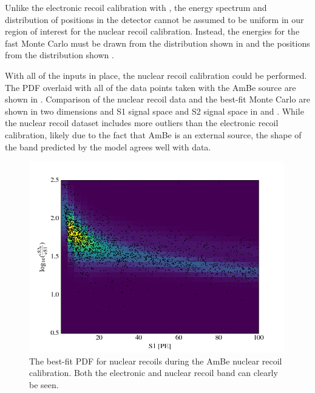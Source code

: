 Unlike the electronic recoil calibration with , the energy spectrum and distribution of positions in the detector cannot be assumed to be uniform in our region of interest for the nuclear recoil calibration.  Instead, the energies for the fast Monte Carlo must be drawn from the distribution shown in  and the positions from the distribution shown .

With all of the inputs in place, the nuclear recoil calibration could be performed.  The PDF overlaid with all of the data points taken with the AmBe source are shown in .  Comparison of the nuclear recoil data and the best-fit Monte Carlo are shown in two dimensions and S1 signal space and S2 signal space in  and .  While the nuclear recoil dataset includes more outliers than the electronic recoil calibration, likely due to the fact that AmBe is an external source, the shape of the band predicted by the model agrees well with data.


\begin{figure}[t]
	\centering
	\includegraphics[width=0.99\textwidth]{xe1t_nr_cal_pdf}
	\caption{The best-fit PDF for nuclear recoils during the AmBe nuclear recoil calibration.  Both the electronic and nuclear recoil band can clearly be seen.}
	\label{fig:xe1t_nr_cal_pdf}
\end{figure}

